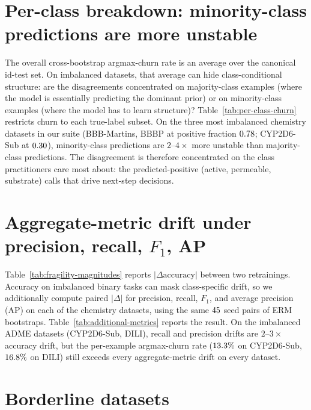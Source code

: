 \section{Per-class breakdown: minority-class predictions are more unstable}
\label{app:per_class_churn}

The overall cross-bootstrap argmax-churn rate is an average over the
canonical id-test set.  On imbalanced datasets, that average can hide
class-conditional structure: are the disagreements concentrated on
majority-class examples (where the model is essentially predicting
the dominant prior) or on minority-class examples (where the model
has to learn structure)?  Table~\ref{tab:per-class-churn} restricts
churn to each true-label subset.  On the three most imbalanced
chemistry datasets in our suite (BBB-Martins, BBBP at positive
fraction $0.78$; CYP2D6-Sub at $0.30$), minority-class predictions
are $2\text{--}4\times$ more unstable than majority-class
predictions.  The disagreement is therefore concentrated on the
class practitioners care most about: the predicted-positive (active,
permeable, substrate) calls that drive next-step decisions.



\section{\boldmath Aggregate-metric drift under precision, recall, $F_1$, AP}
\label{app:additional_metrics}

Table~\ref{tab:fragility-magnitudes} reports
$|\Delta\text{accuracy}|$ between two retrainings.  Accuracy on
imbalanced binary tasks can mask class-specific drift, so we
additionally compute paired $|\Delta|$ for precision, recall, $F_1$,
and average precision (AP) on each of the \nDatasetsHeadline{} chemistry
datasets, using the same $45$ seed pairs of ERM
bootstraps.
Table~\ref{tab:additional-metrics} reports the result.  On the
imbalanced ADME datasets (CYP2D6-Sub, DILI), recall and
precision drifts are $2\text{--}3\times$ accuracy drift, but the
per-example argmax-churn rate ($13.3\%$ on CYP2D6-Sub, $16.8\%$ on DILI)
still exceeds every aggregate-metric drift on every dataset.



\section{Borderline datasets}
\label{app:borderline}

